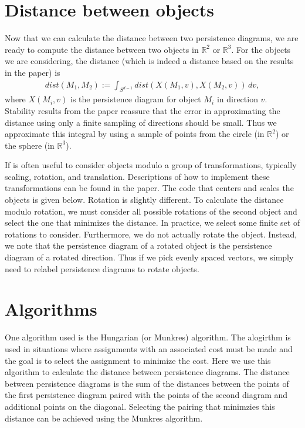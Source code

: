 \documentclass[11pt]{amsart}
\begin{document}
\section{Distance between objects}
Now that we can calculate the distance between two persistence diagrams, we are ready to compute the distance between two objects in $\mathbb{R}^2$ or $\mathbb{R}^3$.  For the objects we are considering, the distance (which is indeed a distance based on the results in the paper) is
\begin{align}
dist(M_1,M_2) := \int_{S^{d-1}} dist(X(M_1,v),X(M_2,v))\,dv,
\end{align}
where $X(M_i,v)$ is the persistence diagram for object $M_i$ in direction $v$.  Stability results from the paper reassure that the error in approximating the distance using only a finite sampling of directions should be small.  Thus we approximate this integral by using a sample of points from the circle (in $\mathbb{R}^2$) or the sphere (in $\mathbb{R}^3$).  

If is often useful to consider objects modulo a group of transformations, typically scaling, rotation, and translation.  Descriptions of how to implement these transformations can be found in the paper.  The code that centers and scales the objects is given below.  Rotation is slightly different.  To calculate the distance modulo rotation, we must consider all possible rotations of the second object and select the one that minimizes the distance.  In practice, we select some finite set of rotations to consider.  Furthermore, we do not actually rotate the object.  Instead, we note that the persistence diagram of a rotated object is the persistence diagram of a rotated direction.  Thus if we pick evenly spaced vectors, we simply need to relabel persistence diagrams to rotate objects.

\section{Algorithms}
One algorithm used is the Hungarian (or Munkres) algorithm.  The alogirthm is used in situations where assignments with an associated cost must be made and the goal is to select the assignment to minimize the cost.  Here we use this algorithm to calculate the distance between persistence diagrams. The distance between persistence diagrams is the sum of the distances between the points of the first persistence diagram paired with the points of the second diagram and additional points on the diagonal.  Selecting the pairing that minimzies this distance can be achieved using the Munkres algorithm.
\end{document}
